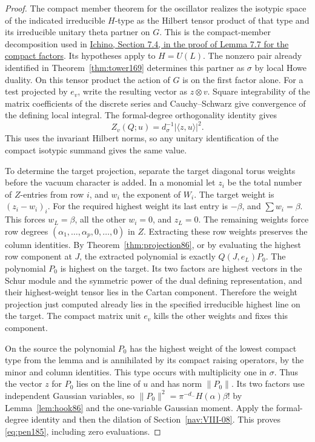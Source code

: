 \documentclass[a4paper,11pt]{article}
\theoremstyle{definition}
\theoremstyle{remark}
\numberwithin{equation}{section}
\begin{document}
\begin{proof}
The compact member theorem for the oscillator realizes the
isotypic space of the indicated irreducible \(H\)-type as
the Hilbert tensor product of that type and its irreducible
unitary theta partner on \(G\). This is the compact-member
decomposition used in
\href{https://arxiv.org/pdf/2002.09148}{Ichino, Section 7.4,
in the proof of Lemma 7.7 for the compact factors}.
Its hypotheses apply to \(H=U(L)\). The nonzero pair already
identified in Theorem~\ref{thm:tower169} determines this
partner as \(\sigma\) by local Howe duality. On this tensor
product the action of \(G\) is on the first factor alone.
For a test projected by \(e_v\), write the resulting vector
as \(z\otimes v\). Square integrability of the matrix
coefficients of the discrete series and Cauchy--Schwarz
give convergence of the defining local integral. The
formal-degree orthogonality identity gives
\[
        Z_v(Q;u)=d_\sigma^{-1}|\langle z,u\rangle|^2 .
\]
This uses the invariant Hilbert norms, so any unitary
identification of the compact isotypic summand gives the
same value.

To determine the target projection, separate the target
diagonal torus weights before the vacuum character is added.
In a monomial let \(z_i\) be the total number of \(Z\)-entries
from row \(i\), and \(w_i\) the exponent of \(W_i\). The target
weight is \((z_i-w_i)_i\). For the required highest weight
its last entry is \(-\beta\), and \(\sum w_i=\beta\). This
forces \(w_L=\beta\), all the other \(w_i=0\), and \(z_L=0\).
The remaining weights force row degrees
\((\alpha_1,\ldots,\alpha_p,0,\ldots,0)\) in \(Z\).
Extracting these row weights preserves the column identities.
By Theorem~\ref{thm:projection86}, or by evaluating the
highest row component at \(J\), the extracted polynomial
is exactly \(Q(J,e_L)P_0\). The polynomial \(P_0\) is
highest on the target. Its two factors are highest vectors
in the Schur module and the symmetric power of the dual
defining representation, and their highest-weight tensor
lies in the Cartan component. Therefore the weight projection
just computed already lies in the specified irreducible
highest line on the target. The compact matrix unit \(e_v\)
kills the other weights and fixes this component.

On the source the polynomial \(P_0\) has the highest
weight of the lowest compact type from the lemma and is
annihilated by its compact raising operators, by the minor
and column identities. This type occurs with multiplicity
one in \(\sigma\). Thus the vector \(z\) for \(P_0\) lies
on the line of \(u\) and has norm \(\|P_0\|\).
Its two factors use independent Gaussian variables, so
\(\|P_0\|^2=\pi^{-d_-}H(\alpha)\beta!\) by Lemma~\ref{lem:hook86}
and the one-variable Gaussian moment. Apply the formal-degree
identity and then the dilation of Section~\ref{nav:VIII-08}. This proves
\eqref{eq:pen185}, including zero evaluations.
\end{proof}
\end{document}
